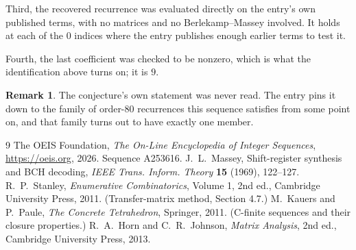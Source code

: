 \documentclass[11pt,a4paper]{article}
\theoremstyle{plain}
\theoremstyle{definition}
\newtheorem{remark}[theorem]{Remark}
\begin{document}
Third, the recovered recurrence was evaluated directly on the entry's own published terms, with
no matrices and no Berlekamp--Massey involved. It holds at each of the $0$ indices where
the entry publishes enough earlier terms to test it.

Fourth, the last coefficient was checked to be nonzero, which is what the identification above
turns on; it is $9$.

\begin{remark}
The conjecture's own statement was never read. The entry pins it down to the family of
order-$80$ recurrences this sequence satisfies from some point on, and that family turns
out to have exactly one member.
\end{remark}

\begin{thebibliography}{9}
 The OEIS Foundation, \emph{The On-Line Encyclopedia of Integer
Sequences}, \url{https://oeis.org}, 2026. Sequence A253616.
 J.~L.~Massey, Shift-register synthesis and BCH decoding, \emph{IEEE
Trans. Inform. Theory} \textbf{15} (1969), 122--127.
 R.~P.~Stanley, \emph{Enumerative Combinatorics}, Volume 1, 2nd ed.,
Cambridge University Press, 2011. (Transfer-matrix method, Section 4.7.)
 M.~Kauers and P.~Paule, \emph{The Concrete Tetrahedron}, Springer, 2011.
(C-finite sequences and their closure properties.)
 R.~A.~Horn and C.~R.~Johnson, \emph{Matrix Analysis}, 2nd ed., Cambridge
University Press, 2013.
\end{thebibliography}
\end{document}
